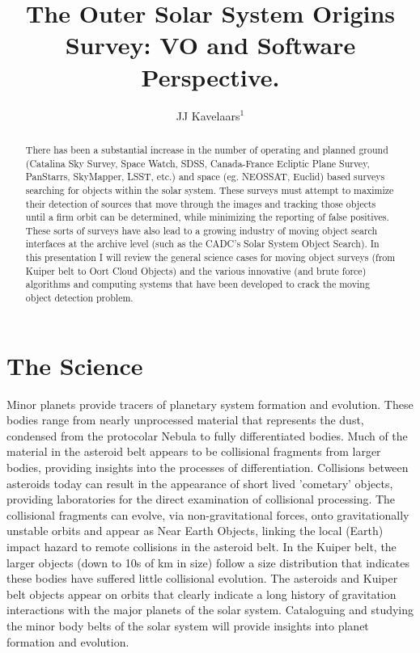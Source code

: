 \documentclass[11pt,twoside]{article}
\begin{document}
\title{The Outer Solar System Origins Survey: VO and Software Perspective.}
\author{JJ Kavelaars$^1$}

\begin{abstract}
There has been a substantial increase in the number of operating and planned ground (Catalina Sky Survey, Space Watch, SDSS, Canada-France Ecliptic Plane Survey, PanStarrs, SkyMapper, LSST, etc.) and space (eg. NEOSSAT, Euclid) based surveys searching for objects within the solar system. These surveys must attempt to maximize their detection of sources that move through the images and tracking those objects until a firm orbit can be determined, while minimizing the reporting of false positives. These sorts of surveys have also lead to a growing industry of moving object search interfaces at the archive level (such as the CADC's Solar System Object Search). In this presentation I will review the general science cases for moving object surveys (from Kuiper belt to Oort Cloud Objects) and the various innovative (and brute force) algorithms and computing systems that have been developed to crack the moving object detection problem.
\end{abstract}

\section{The Science}
Minor planets provide tracers of planetary system formation and evolution. 
These bodies range from nearly unprocessed material that represents the dust, condensed from the protocolar Nebula to fully differentiated bodies. 
Much of the material in the asteroid belt appears to be collisional fragments from larger bodies, providing insights into the processes of differentiation.  
Collisions between asteroids today can result in the appearance of short lived 'cometary' objects, providing laboratories for the direct examination of collisional processing.
The collisional fragments can evolve, via non-gravitational forces, onto gravitationally unstable orbits and appear as Near Earth Objects, linking the local (Earth) impact hazard to remote collisions in the asteroid belt.
In the Kuiper belt, the larger objects (down to 10s of km in size) follow a size distribution that indicates these bodies have suffered little collisional evolution. 
The asteroids and Kuiper belt objects appear on orbits that clearly indicate a long history of gravitation interactions with the major planets of the solar system.
Cataloguing and studying the minor body belts of the solar system will provide insights into planet formation and evolution.
\end{document}
